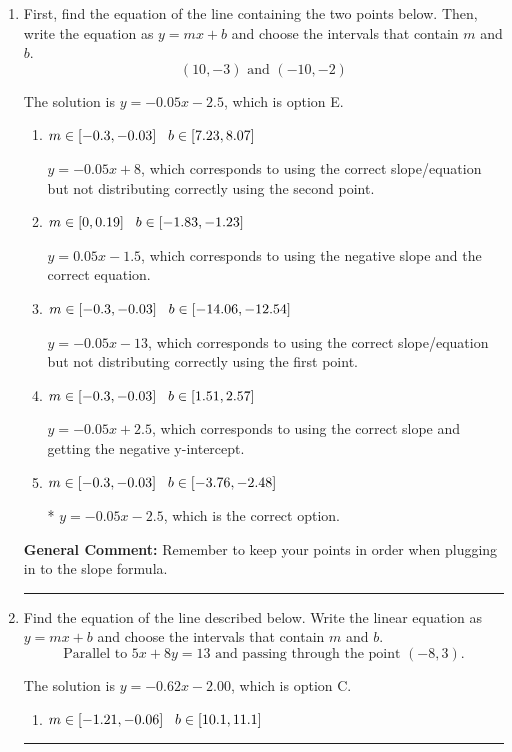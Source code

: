 \documentclass{extbook}[14pt]
\newcommand{\litem}[1]{\item #1

\rule{\textwidth}{0.4pt}}
\begin{document}
\begin{enumerate}\litem{
First, find the equation of the line containing the two points below. Then, write the equation as $ y=mx+b $ and choose the intervals that contain $m$ and $b$.
\[ (10, -3) \text{ and } (-10, -2) \]

The solution is \( y = -0.05x -2.5 \), which is option E.\begin{enumerate}[label=\Alph*.]
\item \( m \in [-0.3, -0.03] \hspace*{3mm} b \in [7.23, 8.07] \)

 $y = -0.05x + 8$, which corresponds to using the correct slope/equation but not distributing correctly using the second point.
\item \( m \in [0, 0.19] \hspace*{3mm} b \in [-1.83, -1.23] \)

 $y = 0.05x -1.5$, which corresponds to using the negative slope and the correct equation.
\item \( m \in [-0.3, -0.03] \hspace*{3mm} b \in [-14.06, -12.54] \)

 $y = -0.05x -13$, which corresponds to using the correct slope/equation but not distributing correctly using the first point.
\item \( m \in [-0.3, -0.03] \hspace*{3mm} b \in [1.51, 2.57] \)

 $y = -0.05x + 2.5$, which corresponds to using the correct slope and getting the negative y-intercept.
\item \( m \in [-0.3, -0.03] \hspace*{3mm} b \in [-3.76, -2.48] \)

* $y = -0.05x -2.5$, which is the correct option.
\end{enumerate}

\textbf{General Comment:} Remember to keep your points in order when plugging in to the slope formula.
}
\litem{
Find the equation of the line described below. Write the linear equation as $ y=mx+b $ and choose the intervals that contain $m$ and $b$.
\[ \text{Parallel to } 5 x + 8 y = 13 \text{ and passing through the point } (-8, 3). \]

The solution is \( y = -0.62x - 2.00 \), which is option C.\begin{enumerate}[label=\Alph*.]
\item \( m \in [-1.21, -0.06] \hspace*{3mm} b \in [10.1, 11.1] \)


\end{enumerate}}
\end{enumerate}
\end{document}
